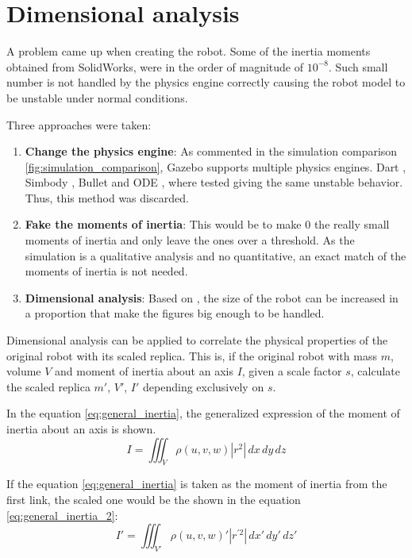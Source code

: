 \section{Dimensional analysis} %
\label{sec:dimensional_analysis}
A problem came up when creating the robot. 
Some of the inertia moments obtained from SolidWorks, were in the order of magnitude of $10^{-8}$.
Such small number is not handled by the physics engine correctly causing the robot model to be unstable under normal conditions.

Three approaches were taken:
\begin{enumerate}
  \item \textbf{Change the physics engine}: As commented in the simulation comparison \ref{fig:simulation_comparison}, Gazebo supports multiple physics engines. Dart \cite{dart}, Simbody \cite{simbody}, Bullet \cite{bullet} and ODE \cite{ode}, where tested giving the same unstable behavior. 
  Thus, this method was discarded.
  \item \textbf{Fake the moments of inertia}: This would be to make 0 the really small moments of inertia and only leave the ones over a threshold.
  As the simulation is a qualitative analysis and no quantitative, an exact match of the moments of inertia is not needed. 
  \item \textbf{Dimensional analysis}: Based on \cite{dimensional_analysis}, the size of the robot can be increased in a proportion that make the figures big enough to be handled.
\end{enumerate}

Dimensional analysis can be applied to correlate the physical properties of the original robot with its scaled replica.
This is, if the original robot with mass $m$, volume $V$ and moment of inertia about an axis $I$, given a scale factor $s$, calculate the scaled replica $m'$, $V'$, $I'$ depending exclusively on $s$.

In the equation \ref{eq:general_inertia}, the generalized expression of the moment of inertia about an axis is shown.
\begin{equation}
\label{eq:general_inertia}
  I = \iiint_V \rho(u,v,w) |r^{2}| \,dx\,dy\,dz
\end{equation}

If the equation \ref{eq:general_inertia} is taken as the moment of inertia from the first link, the scaled one would be the shown in the equation \ref{eq:general_inertia_2}:
\begin{equation}
\label{eq:general_inertia_2}
  I' = \iiint_{V'} \rho(u,v,w)' |r^{'2}| \,dx'\,dy'\,dz'
\end{equation}

